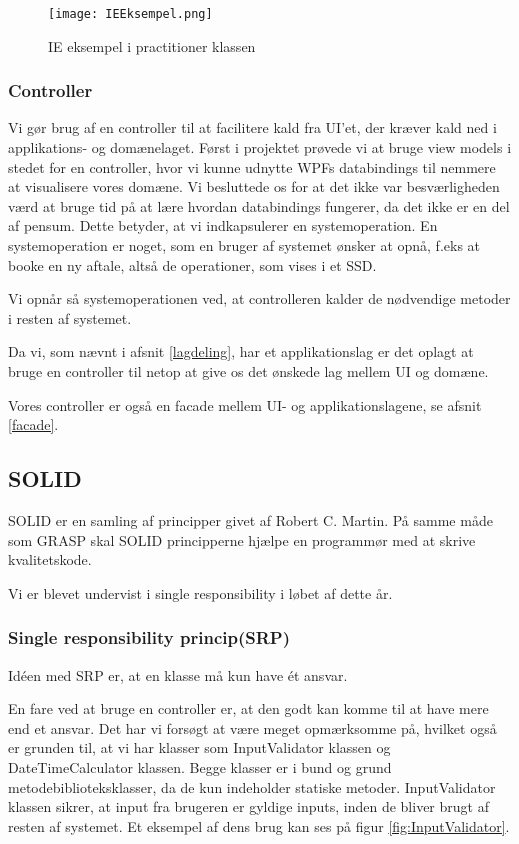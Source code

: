 \begin{figure}[h]
    \caption{IE eksempel i practitioner klassen}
    \centering
        \texttt{[image: IEEksempel.png]}
    \label{fig:informationexpert}
\end{figure}

\subsubsection{Controller}
\label{controller}
Vi gør brug af en controller til at facilitere kald fra UI'et, der kræver kald ned i applikations- og domænelaget.
Først i projektet prøvede vi at bruge view models i stedet for en controller, hvor vi kunne udnytte WPFs databindings til nemmere at visualisere vores domæne.
Vi besluttede os for at det ikke var besværligheden værd at bruge tid på at lære hvordan databindings fungerer, da det ikke er en del af pensum.
Dette betyder, at vi indkapsulerer en systemoperation.
En systemoperation er noget, som en bruger af systemet ønsker at opnå, f.eks at booke en ny aftale, altså de operationer, som vises i et SSD.

Vi opnår så systemoperationen ved, at controlleren kalder de nødvendige metoder i resten af systemet.

Da vi, som nævnt i afsnit \ref{lagdeling}, har et applikationslag er det oplagt at bruge en controller til netop at give os det ønskede lag mellem UI og domæne.

Vores controller er også en facade mellem UI- og applikationslagene, se afsnit \ref{facade}.

\subsection{SOLID}
\label{solid}

SOLID er en samling af principper givet af Robert C. Martin.
På samme måde som GRASP skal SOLID principperne hjælpe en programmør med at skrive kvalitetskode.

Vi er blevet undervist i single responsibility i løbet af dette år.

\subsubsection{Single responsibility princip(SRP)}
\label{SRP}

Idéen med SRP er, at en klasse må kun have ét ansvar.\cite{solid}

En fare ved at bruge en controller er, at den godt kan komme til at have mere end et ansvar.
Det har vi forsøgt at være meget opmærksomme på, hvilket også er grunden til, at vi har klasser som InputValidator klassen og DateTimeCalculator klassen.
Begge klasser er i bund og grund metodebiblioteksklasser, da de kun indeholder statiske metoder.
InputValidator klassen sikrer, at input fra brugeren er gyldige inputs, inden de bliver brugt af resten af systemet.
Et eksempel af dens brug kan ses på figur \ref{fig:InputValidator}.

